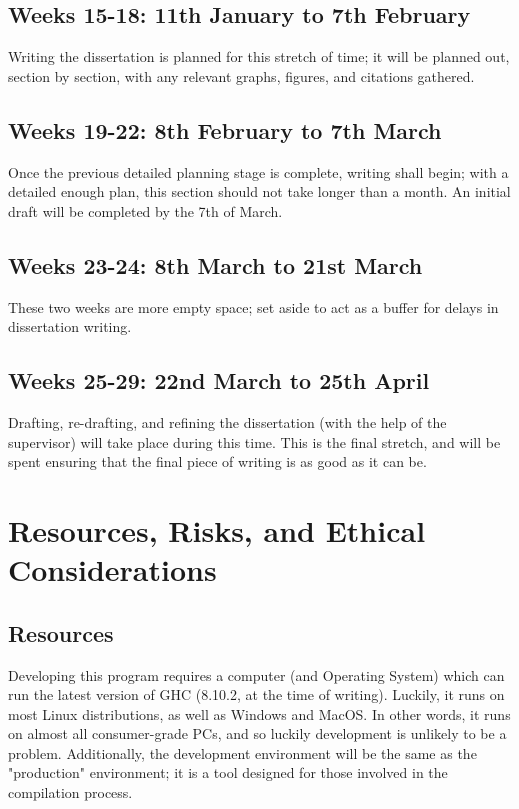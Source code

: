 \documentclass[12pt, a4paper]{scrartcl}
\begin{document}
\subsection{Weeks 15-18: 11th January to 7th February}

Writing the dissertation is planned for this stretch of time; it will be planned out, section by section, with any relevant graphs, figures, and citations gathered.

\subsection{Weeks 19-22: 8th February to 7th March}

Once the previous detailed planning stage is complete, writing shall begin; with a detailed enough plan, this section should not take longer than a month. An initial draft will be completed by the 7th of March.

\subsection{Weeks 23-24: 8th March to 21st March}

These two weeks are more empty space; set aside to act as a buffer for delays in dissertation writing.

\subsection{Weeks 25-29: 22nd March to 25th April}

Drafting, re-drafting, and refining the dissertation (with the help of the supervisor) will take place during this time. This is the final stretch, and will be spent ensuring that the final piece of writing is as good as it can be.

\section{Resources, Risks, and Ethical Considerations}

\subsection{Resources}

Developing this program requires a computer (and Operating System) which can run the latest version of GHC (8.10.2, at the time of writing). Luckily, it runs on most Linux distributions, as well as Windows and MacOS. In other words, it runs on almost all consumer-grade PCs, and so luckily development is unlikely to be a problem. Additionally, the development environment will be the same as the "production" environment; it is a tool designed for those involved in the compilation process.
\end{document}
